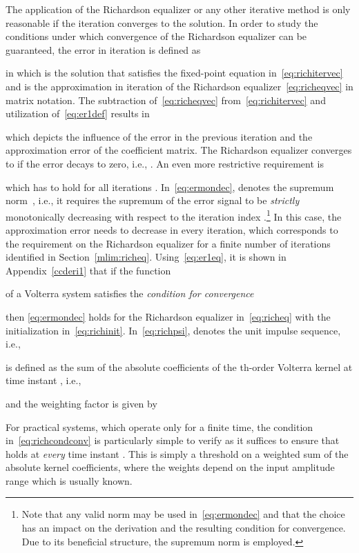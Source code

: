 \documentclass[10pt,twocolumn,twoside]{IEEEtran}
\begin{document}
The application of the Richardson equalizer or any
other iterative method is only reasonable if the iteration converges to the
solution. In order to study the conditions under which convergence of the
Richardson equalizer can be guaranteed, the error  in
iteration  is defined as

in which  is the solution that satisfies the fixed-point equation
in~\eqref{eq:richitervec} and  is the approximation in
iteration  of the Richardson equalizer~\eqref{eq:richeqvec} in matrix notation.
The subtraction of~\eqref{eq:richeqvec} from~\eqref{eq:richitervec} and
utilization of~\eqref{eq:er1def} results in

which depicts the influence of the error  in the previous
iteration and the approximation error 
of the coefficient matrix. The Richardson equalizer converges to  if
the error decays to zero, i.e., .
An even more restrictive requirement is

which has to hold for all iterations .
In~\eqref{eq:ermondec},  denotes the supremum norm~\cite{rudin1964}, i.e.,
it requires the supremum of the error signal to be \emph{strictly} monotonically
decreasing with respect to the iteration index .\footnote{Note
that any valid norm may be used in~\eqref{eq:ermondec} and that the choice has an impact on the derivation
and the resulting condition for convergence. Due to its beneficial structure,
the supremum norm is employed.} In this case,
the approximation error needs to decrease in every iteration, which corresponds to
the requirement on the Richardson equalizer for a finite number of iterations
identified in Section~\ref{mlim:richeq}. Using~\eqref{eq:er1eq},
it is shown in Appendix~\ref{ccderi1} that if the function

of a Volterra system  satisfies the \emph{condition for convergence}

then \eqref{eq:ermondec} holds for the Richardson equalizer in~\eqref{eq:richeq}
with the initialization in~\eqref{eq:richinit}.
In~\eqref{eq:richpsi},  denotes the unit impulse sequence, i.e.,

 is defined as the sum of the absolute coefficients of the
th-order Volterra kernel at time instant , i.e.,

and the weighting factor  is given by

For practical systems, which operate only for a finite time,
the condition in~\eqref{eq:richcondconv} is particularly
simple to verify as it suffices to ensure that 
holds at \emph{every} time instant . This is simply a threshold on a weighted
sum of the absolute kernel coefficients, where the weights
depend on the input amplitude range which is usually known.
\end{document}
